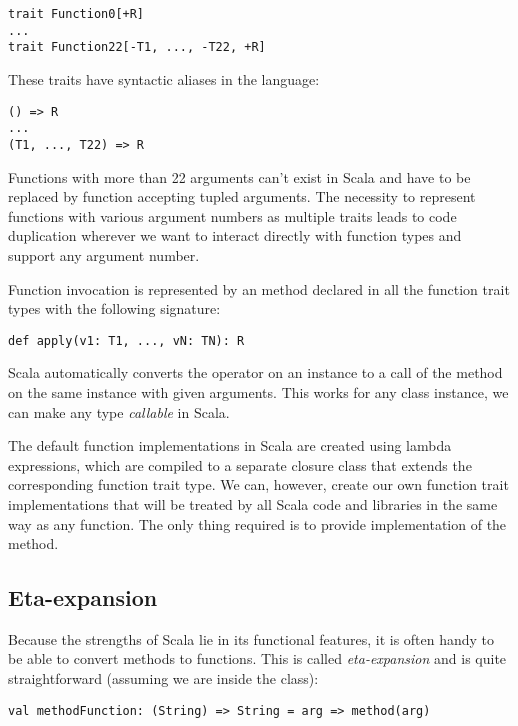 \lstset{style=Scala}
\begin{lstlisting}
trait Function0[+R]
...
trait Function22[-T1, ..., -T22, +R]
\end{lstlisting}

These traits have syntactic aliases in the language:

\lstset{style=Scala}
\begin{lstlisting}
() => R
...
(T1, ..., T22) => R
\end{lstlisting}

Functions with more than 22 arguments can't exist in Scala and have to be replaced by function accepting tupled arguments. The necessity to represent functions with various argument numbers as multiple traits leads to code duplication wherever we want to interact directly with function types and support any argument number.

Function invocation is represented by an  method declared in all the function trait types with the following signature:
\lstset{style=Scala}
\begin{lstlisting}
def apply(v1: T1, ..., vN: TN): R
\end{lstlisting}

Scala automatically converts the \inlinecode{()} operator on an instance to a call of the  method on the same instance with given arguments. This works for any class instance, we can make any type \textit{callable} in Scala.

The default function implementations in Scala are created using lambda expressions, which are compiled to a separate closure class that extends the corresponding function trait type. We can, however, create our own function trait implementations that will be treated by all Scala code and libraries in the same way as any function. The only thing required is to provide implementation of the  method.

\subsection{Eta-expansion}
\label{subsec:etaexpansion}

Because the strengths of Scala lie in its functional features, it is often handy to be able to convert methods to functions. This is called \textit{eta-expansion} and is quite straightforward (assuming we are inside the class):

\lstset{style=Scala}
\begin{lstlisting}
val methodFunction: (String) => String = arg => method(arg)
\end{lstlisting}

